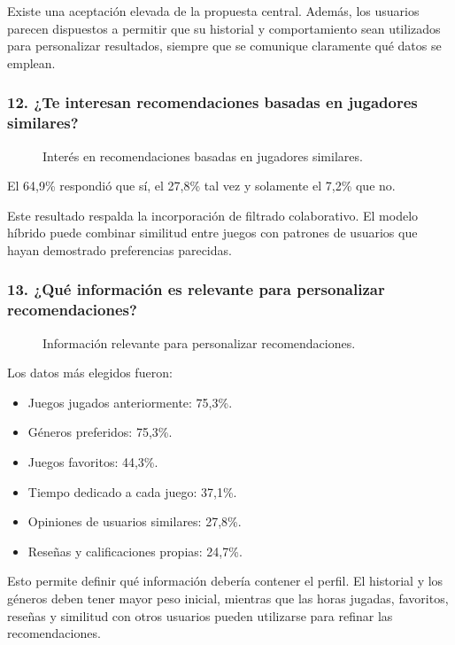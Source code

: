 Existe una aceptación elevada de la propuesta central. Además, los usuarios parecen dispuestos a permitir que su historial y comportamiento sean utilizados para personalizar resultados, siempre que se comunique claramente qué datos se emplean.

\subsubsection*{12. ¿Te interesan recomendaciones basadas en jugadores similares?}

\begin{figure}[H]
	\centering
	\caption{Interés en recomendaciones basadas en jugadores similares.}
	\label{fig:enc-p12}
\end{figure}

El 64,9\% respondió que sí, el 27,8\% tal vez y solamente el 7,2\% que no.

Este resultado respalda la incorporación de filtrado colaborativo. El modelo híbrido puede combinar similitud entre juegos con patrones de usuarios que hayan demostrado preferencias parecidas.

\subsubsection*{13. ¿Qué información es relevante para personalizar recomendaciones?}

\begin{figure}[H]
	\centering
	\caption{Información relevante para personalizar recomendaciones.}
	\label{fig:enc-p13}
\end{figure}

Los datos más elegidos fueron:

\begin{itemize}
	\item Juegos jugados anteriormente: 75,3\%.
	\item Géneros preferidos: 75,3\%.
	\item Juegos favoritos: 44,3\%.
	\item Tiempo dedicado a cada juego: 37,1\%.
	\item Opiniones de usuarios similares: 27,8\%.
	\item Reseñas y calificaciones propias: 24,7\%.
\end{itemize}

Esto permite definir qué información debería contener el perfil. El historial y los géneros deben tener mayor peso inicial, mientras que las horas jugadas, favoritos, reseñas y similitud con otros usuarios pueden utilizarse para refinar las recomendaciones.

